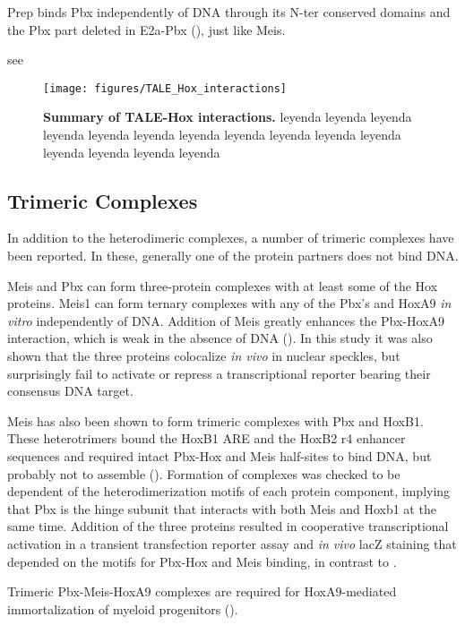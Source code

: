 Prep binds Pbx independently of DNA through its \ac{N-ter} conserved domains and the Pbx part deleted in E2a-Pbx (\cite{Berthelsen1998}), just like Meis. 

see \cite{Mann1996}

\begin{figure}[]
  
  \centering
  \texttt{[image: figures/TALE\_Hox\_interactions]}
  \caption[Summary of TALE-Hox interactions]{\textbf{Summary of TALE-Hox interactions.} leyenda leyenda leyenda leyenda leyenda leyenda leyenda leyenda leyenda leyenda leyenda leyenda leyenda leyenda leyenda}
  \label{fig:TALE_Hox_interactions}
\end{figure}


\subsection{Trimeric Complexes}

In addition to the heterodimeric complexes, a number of trimeric complexes have been reported. In these, generally one of the protein partners does not bind DNA. 

Meis and Pbx can form three-protein complexes with at least some of the Hox proteins. Meis1 can form ternary complexes with any of the Pbx's and HoxA9 \textit{in vitro} independently of DNA. Addition of Meis greatly enhances the  Pbx-HoxA9 interaction, which is weak in the absence of DNA (\cite{Shen1999}). In this study it was also shown that the three proteins colocalize \textit{in vivo} in nuclear speckles, but surprisingly fail to activate or repress a transcriptional reporter bearing their consensus DNA target. 

Meis has also been shown to form trimeric complexes with Pbx and HoxB1. These heterotrimers bound the HoxB1 ARE and the HoxB2 r4 enhancer sequences and required intact Pbx-Hox and Meis half-sites to bind DNA, but probably not to assemble (\cite{Jacobs1999}). Formation of complexes was checked to be dependent of the heterodimerization motifs of each protein component, implying that Pbx is the hinge subunit that interacts with both Meis and Hoxb1 at the same time. Addition of the three proteins resulted in cooperative transcriptional activation in a transient transfection reporter assay and \textit{in vivo} lacZ staining that depended on the motifs for Pbx-Hox and Meis binding, in contrast to \cite{Shen1999}. 

Trimeric Pbx-Meis-HoxA9 complexes are required for HoxA9-mediated immortalization of myeloid progenitors (\cite{Schnabel2000}).

